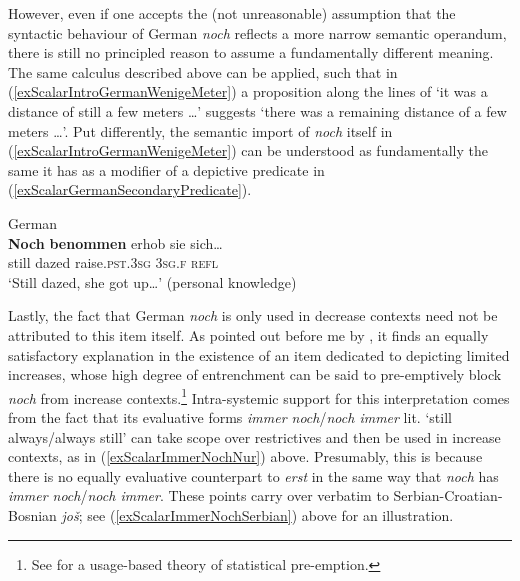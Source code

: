 However, even if one accepts the (not unreasonable) assumption that the syntactic behaviour of German \textit{noch} reflects a more narrow semantic operandum, there is still no principled reason to assume a fundamentally different meaning. The same calculus described above can be applied, such that in (\ref{exScalarIntroGermanWenigeMeter}) a proposition along the lines of \lq{}it was a distance of still a few meters …\rq{ }suggests \lq there was a remaining distance of a few meters …\rq{}. Put differently, the semantic import of \textit{noch} itself in (\ref{exScalarIntroGermanWenigeMeter}) can be understood as fundamentally the same it has as a modifier of a depictive predicate in (\ref{exScalarGermanSecondaryPredicate}).

\begin{exe}
	\ex 
	German\label{exScalarGermanSecondaryPredicate}\\
	\gll \textbf{Noch} \textbf{benommen} erhob sie sich…\\
	still dazed raise.\textsc{pst}.3\textsc{sg} 3\textsc{sg}.\textsc{f} \textsc{refl}\\
	\glt \lq Still dazed, she got up…\rq{ }(personal knowledge)
\end{exe}

Lastly, the fact that German \textit{noch} is only used in decrease contexts need not be attributed to this item itself. As pointed out before me by \textcite{Garrido1992}, it finds an equally satisfactory explanation in the existence of an item dedicated to depicting limited increases, whose high degree of entrenchment can be said to pre-emptively block \textit{noch} from increase contexts.\footnote{See \textcite[ch. 5]{Goldberg2019} for a usage-based theory of statistical pre-emption.}  Intra-systemic support for this interpretation comes from the fact that its evaluative forms \textit{immer noch}/\textit{noch immer} lit. \lq{}still always/always still\rq{} can take scope over restrictives and then be used in increase contexts, as in (\ref{exScalarImmerNochNur}) above. Presumably, this is because there is no equally evaluative counterpart to \textit{erst} in the same way that \textit{noch} has \textit{immer noch}/\textit{noch immer}. These points carry over verbatim to Serbian\hyp Croatian\hyp Bosnian \textit{još}; see (\ref{exScalarImmerNochSerbian}) above for an illustration.\largerpage


